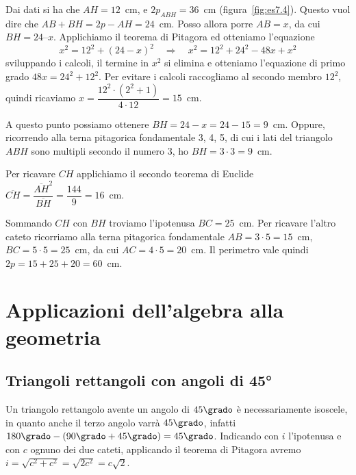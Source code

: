\begin{exrig}
\begin{esempio}
Dai dati si ha che \(AH = 12\)~cm, e \(2p_{ABH} = 36\)~cm 
(figura~\ref{fig:es7.4}).
Questo vuol dire che \(AB + BH = 2p - AH = 24\)~cm. 
Posso allora porre \(AB = x\), da cui \(BH = 24 – x\).
Applichiamo il teorema di Pitagora ed otteniamo l'equazione
\[x^2 = 12^2 + (24 - x)^2 \quad\Rightarrow\quad x^2 = 12^2 + 24^2 - 
48x + x^2\]
sviluppando i calcoli, il termine in \(x^2\) si elimina e otteniamo 
l'equazione di primo grado \(48x = 24^2 + 12^2\).
Per evitare i calcoli raccogliamo al secondo membro \(12^2\), quindi 
ricaviamo \(x=\dfrac{12^2\cdot\left(2^2+1\right)}{4\cdot 12}=15\)~cm.

A questo punto possiamo ottenere \(BH = 24-x = 24-15 = 9\)~cm. Oppure, 
ricorrendo alla terna pitagorica fondamentale 3, 4, 5, di cui i lati 
del triangolo \(ABH\) sono multipli secondo il numero 3, ho \(BH = 3 
\cdot 3 = 9\)~cm.

Per ricavare \(CH\) applichiamo il secondo teorema di Euclide 
\(\overline{CH}=\dfrac{\overline{AH}^2}{\overline{BH}}=\dfrac{144}{9}
=16\)~cm.

Sommando \(CH\) con \(BH\) troviamo l'ipotenusa \(BC=25\)~cm. Per ricavare 
l'altro cateto ricorriamo alla terna pitagorica fondamentale 
\(AB=3\cdot 5=15\)~cm, \(BC=5\cdot 5=25\)~cm, da cui \(AC=4\cdot 5=20\)~cm.
Il perimetro vale quindi \(2p=15+25+20=60\)~cm.
\end{esempio}
\end{exrig}

\section{Applicazioni dell'algebra alla 
geometria}\label{sect:applicazioni_algebra}

\subsection{Triangoli rettangoli con angoli di 45°}

\begin{wrapfigure}{r}{0.25\textwidth}
	\centering
\end{wrapfigure}
Un triangolo rettangolo avente un angolo di \(45\grado\) è 
necessariamente isoscele, in quanto anche il terzo angolo varrà 
\(45\grado\), infatti \(180\grado - (90\grado+45\grado)=45\grado\).
Indicando con \(i\) l'ipotenusa e con \(c\) ognuno dei due cateti, 
applicando il teorema di Pitagora avremo 
\(i=\sqrt{c^2+c^2}=\sqrt{2c^2}=c\sqrt{2}\).

